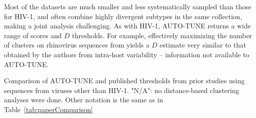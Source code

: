 \documentclass[utf8]{FrontiersinHarvard} %
\begin{document}
Most of the datasets are much smaller and less systematically sampled than
those for HIV-1, and often combine highly divergent subtypes in the same
collection, making a joint analysis challenging. As with HIV-1, AUTO-TUNE
returns a wide range of scores and $D$ thresholds. For example, effectively
maximizing the number of clusters on rhinovirus sequences from
\citet{Ng:2022aa} yields a $D$ estimate very similar to that obtained by the
authors from intra-host variability -- information not available to AUTO-TUNE.

\begin{table}[h]
	\caption{Comparison of AUTO-TUNE and published thresholds from prior studies using sequences from viruses other than HIV-1. "N/A": no distance-based clustering analyses were done. Other notation is the same as in Table~\ref{tab:paperComparison}}


\end{table}
\end{document}
